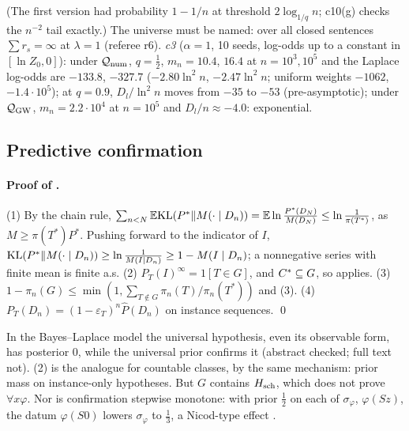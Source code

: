 (The first version had probability $1-1/n$ at threshold $2\log_{1/q}n$; c10(g) checks the $n^{-2}$ tail exactly.) The universe must be named: over all closed sentences $\sum r_s=\infty$ at $\lambda=1$ (referee r6). \emph{c3} ($\alpha=1$, 10 seeds, log-odds up to a constant in $[\ln Z_0,0]$): under $\mathcal{Q}_{\mathrm{num}}$, $q=\tfrac12$, $m_n=10.4$, $16.4$ at $n=10^3,10^5$ and the Laplace log-odds are $-133.8$, $-327.7$ ($-2.80\ln^2n$, $-2.47\ln^2n$; uniform weights $-1062$, $-1.4\cdot10^5$); at $q=0.9$, $D_l/\ln^2n$ moves from $-35$ to $-53$ (pre-asymptotic); under $\mathcal{Q}_{\mathrm{GW}}$, $m_n=2.2\cdot10^4$ at $n=10^5$ and $D_l/n\approx-4.0$: exponential.

\subsection{Predictive confirmation}\label{app:univ:confirm}

\paragraph{Proof of .} (1) By the chain rule, $\sum_{n<N}\mathbb{E}\mathrm{KL}(P^*\|M(\cdot\mid D_n))=\mathbb{E}\ln\frac{P^*(D_N)}{M(D_N)}\le\ln\frac1{\pi(T^*)}$, as $M\ge\pi(T^*)P^*$. Pushing forward to the indicator of $I$, $\mathrm{KL}(P^*\|M(\cdot\mid D_n))\ge\ln\frac1{M(I\mid D_n)}\ge1-M(I\mid D_n)$; a nonnegative series with finite mean is finite a.s. (2) $P_T(I)^\infty=1[T\in G]$, and $C^{*}\subseteq G$, so  applies. (3) $1-\pi_n(G)\le\min(1,\sum_{T\notin G}\pi_n(T)/\pi_n(T^*))$ and (3). (4) $P_T(D_n)=(1-\varepsilon_T)^n\hat P(D_n)$ on instance sequences. \qed

\begin{remark}\label{rem:univ:hutter}
In the Bayes--Laplace model the universal hypothesis, even its observable form, has posterior $0$, while the universal prior confirms it \citep{hutter2007universal} (abstract checked; full text not). (2) is the analogue for countable classes, by the same mechanism: prior mass on instance-only hypotheses. But $G$ contains $H_{\mathrm{sch}}$, which does not prove $\forall x\varphi$. Nor is confirmation stepwise monotone: with prior $\tfrac12$ on each of $\sigma_\varphi$, $\varphi(Sz)$, the datum $\varphi(S0)$ lowers $\sigma_\varphi$ to $\tfrac13$, a Nicod-type effect \citep{leike2015solomonoff}.
\end{remark}

